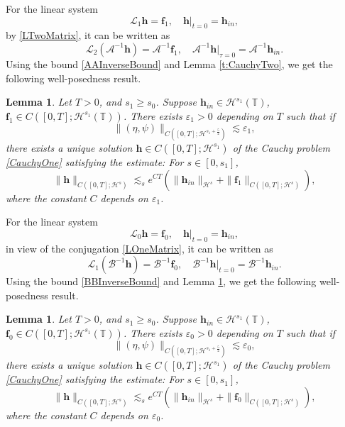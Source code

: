 \documentclass[12pt]{amsart}
\newtheorem{lemma}[theorem]{Lemma}
\theoremstyle{remark}
\theoremstyle{definition}
\numberwithin{equation}{section}
\renewcommand{\H}{{\mathcal H }}
\newcommand{\f}{\frac}
\newcommand{\T}{{\mathbb T}}
\newcommand{\mL}{\mathcal{L}}
\begin{document}
For the linear system 
\begin{equation} \label{CauchyOne}
  \mL_1  \mathbf{h} = \mathbf{f}_1, \quad \mathbf{h}|_{t=0} = \mathbf{h}_{in},
\end{equation}
by \eqref{LTwoMatrix}, it can be written as 
\begin{equation*} 
\mL_2(\mathcal{A}^{-1}\mathbf{h}) = \mathcal{A}^{-1}\mathbf{f}_1, \quad \mathcal{A}^{-1}\mathbf{h}|_{\tau=0} = \mathcal{A}^{-1}\mathbf{h}_{in}.
 \end{equation*}
Using the bound \eqref{AAInverseBound} and Lemma \ref{t:CauchyTwo}, we get the following well-posedness result.
\begin{lemma} \label{t:CauchyOne}
Let $T>0$, and $s_1\geq s_0$.
Suppose $\mathbf{h}_{in} \in \H^{s_1}(\T)$, $\mathbf{f}_1\in C([0,T]; \H^{s_1}(\T))$.
There exists $\varepsilon_1>0$ depending on $T$ such that if 
\begin{equation*}
 \|(\eta, \psi)\|_{C([0,T]; \H^{s_1+\f52})} \lesssim \varepsilon_1 ,
\end{equation*}
there exists a unique solution $\mathbf{h}\in C([0,T]; \H^{s_1})$ of the Cauchy problem \eqref{CauchyOne} satisfying the estimate:
For $s\in [0, s_1]$, 
\begin{equation} \label{mR1EnergyEst}
 \| \mathbf{h}\|_{C([0,T]; \H^s)} \lesssim_s e^{CT}\left(\|\mathbf{h}_{in} \|_{\H^s} + \| \mathbf{f}_1\|_{C([0,T]; \H^s)}\right),
\end{equation}
where the constant $C$ depends on $\varepsilon_1$.
\end{lemma}

For the linear system 
\begin{equation} \label{CauchyZero1}
  \mL_0  \mathbf{h} = \mathbf{f}_0, \quad \mathbf{h}|_{t=0} = \mathbf{h}_{in},
\end{equation}
in view of the conjugation \eqref{LOneMatrix}, it can be written as
\begin{equation*} 
\mL_1(\mathcal{B}^{-1}\mathbf{h}) = \mathcal{B}^{-1}\mathbf{f}_0, \quad \mathcal{B}^{-1}\mathbf{h}|_{t=0} = \mathcal{B}^{-1}\mathbf{h}_{in}.
 \end{equation*}
Using the bound \eqref{BBInverseBound} and Lemma \ref{t:CauchyOne}, we get the following well-posedness result.
\begin{lemma} \label{t:CauchyZero1}
Let $T>0$, and $s_1\geq s_0$.
Suppose $\mathbf{h}_{in} \in \H^{s_1}(\T)$, $\mathbf{f}_0\in C([0,T]; \H^{s_1}(\T))$.
There exists $\varepsilon_0>0$ depending on $T$ such that if 
\begin{equation*}
 \|(\eta, \psi)\|_{C([0,T]; \H^{s_1+\f52})} \lesssim \varepsilon_0,
\end{equation*}
there exists a unique solution $\mathbf{h}\in C([0,T]; \H^{s_1})$ of the Cauchy problem \eqref{CauchyOne} satisfying the estimate:
For $s\in [0, s_1]$, 
\begin{equation} \label{mR01EnergyEst}
 \| \mathbf{h}\|_{C([0,T]; \H^s)} \lesssim_s e^{CT}\left(\|\mathbf{h}_{in} \|_{\H^s} + \| \mathbf{f}_0\|_{C([0,T]; \H^s)}\right),
\end{equation}
where the constant $C$ depends on $\varepsilon_0$.
\end{lemma}
\end{document}
